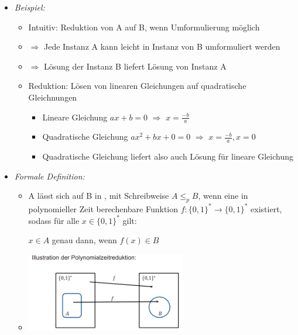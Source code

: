 \documentclass[
    12pt,
    a4paper,
    ngerman,
    color=3b,%
    marginpar=false,
    colorback=false,
    leqno,
]{tudaexercise}
\begin{document}
\begin{itemize}
\begin{itemize}
              \item \textit{Beispiel:}
                    \begin{itemize}
                        \item Intuitiv: Reduktion von A auf B, wenn Umformulierung möglich
                        \item[] $\Rightarrow$ Jede Instanz A kann leicht in Instanz von B umformuliert werden
                        \item[] $\Rightarrow$ Lösung der Instanz B liefert Lösung von Instanz A
                        \item Reduktion: Lösen von linearen Gleichungen auf quadratische Gleichnungen
                              \begin{itemize}
                                  \item Lineare Gleichung $ax + b = 0$ $\Rightarrow$ $x= \frac{-b}{a}$
                                  \item Quadratische Gleichung $ax^2 + bx + 0 = 0$ $\Rightarrow$ $x = \frac{-b}{a}, x = 0$
                                  \item Quadratische Gleichung liefert also auch Lösung für lineare Gleichung
                              \end{itemize}
                    \end{itemize}

              \item \textit{Formale Definition:}
                    \begin{itemize}
                        \item[]
                              A lässt sich auf B in , mit Schreibweise $A \leq_p B$, wenn eine
                              in polynomieller Zeit berechenbare Funktion $f: \{0,1\}^* \rightarrow \{0,1\}^*$ existiert, sodass
                              für alle $x \in \{0,1\}^*$ gilt: \\
                              \centerline{$x \in A$ genau dann, wenn $f(x)\in B$}
                        \item[] \includegraphics[width=7cm]{pictures/reduktion2.PNG}
                    \end{itemize}
          \end{itemize}


\end{itemize}
\end{document}
